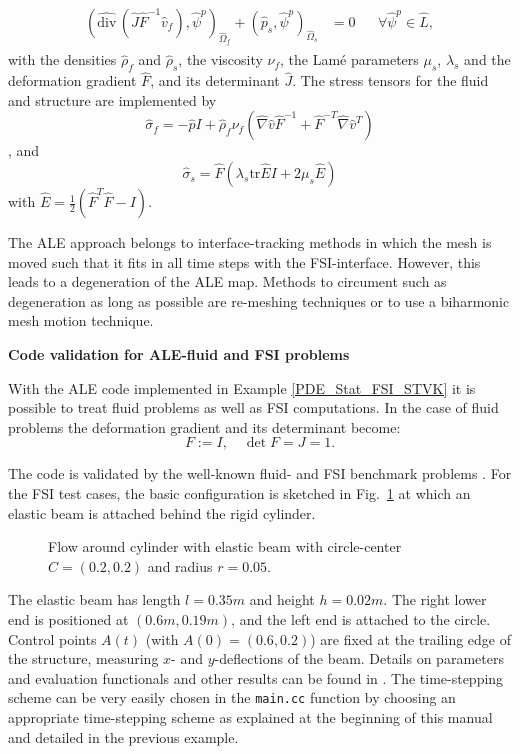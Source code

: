 \begin{Problem}
\begin{eqnarray*}
\begin{aligned}
      (\widehat{\text{div}}\,(\hat J\hat F^{-1}
      \hat v_f),\hat\psi^p)_{\hat\Omega_f} 
      + (\hat p_s ,\hat \psi^p)_{\hat\Omega_s}
      &=0&&\forall\hat\psi^p\in \hat L,
    \end{aligned}
  \end{eqnarray*}  
  with the densities $\hat\rho_f$ and $\hat\rho_s$, 
the viscosity $\nu_f$, the Lam\'e parameters 
$\mu_s$, $\lambda_s$ and the deformation gradient $\hat F$, and its
determinant $\hat J$. The stress tensors for the fluid and structure are
implemented by 
\[
\hat\sigma_f = -\hat pI + \hat\rho_f\nu_f (\hat\nabla\hat v \hat F^{-1}
  + \hat F^{-T} \hat\nabla\hat v^T)
\], 
and 
\[
\hat\sigma_s = \hat F (\lambda_s \text{tr}\hat E I + 2\mu_s \hat E)
\]
with $\hat E = \frac{1}{2}(\hat F^T \hat F - I)$.
\end{Problem}
The ALE approach belongs to interface-tracking methods in which 
the mesh is moved such that it fits in all time steps with 
the FSI-interface. However, this leads to 
a degeneration of the ALE map. Methods to circument such as 
degeneration as long as possible are re-meshing techniques or 
to use a biharmonic mesh motion technique.






{\bf Code validation for ALE-fluid and FSI problems}

With the ALE code implemented in Example 
\ref{PDE_Stat_FSI_STVK} it is possible to treat fluid 
problems as well as FSI computations. 
In the case of fluid problems the deformation
gradient and its determinant become:
\begin{equation*}
F:= I , \quad \det F = J = 1.
\end{equation*}

The code is validated by the well-known 
fluid- and FSI benchmark problems \cite{SchaeTu96, HrTu06b}. 
For the FSI test cases, 
the basic configuration is 
sketched in Fig.~\ref{configuration_csm_and_fsi_2D} 
at which an elastic beam is attached 
behind the rigid cylinder. 

\begin{figure}[h]
\centering

\caption{Flow around cylinder with elastic beam with 
circle-center $C=(0.2,0.2)$ and radius $r=0.05$.}
\label{configuration_csm_and_fsi_2D}
\end{figure}


The elastic beam has length
$l=0.35m$ and height $h=0.02m$. The right lower end is positioned at 
$(0.6m,0.19m)$, and
the left end is attached to the circle. 
Control points $A(t)$ (with $A(0) = (0.6,0.2)$) are fixed at the 
trailing edge of the structure, measuring $x$- and $y$-deflections of the beam.
Details 
on parameters and evaluation functionals and other results 
can be found in \cite{HrTu06b,BuSc06,Wi11}. 
The time-stepping scheme can be 
very easily chosen in the \texttt{main.cc} function by choosing an appropriate 
time-stepping scheme as explained at the beginning of this manual
and detailed in the previous example.


